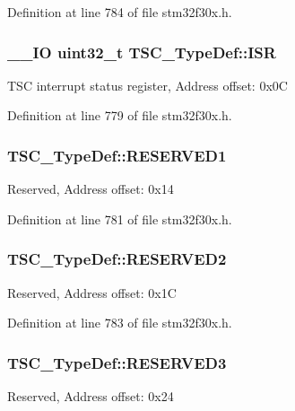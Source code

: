 Definition at line 784 of file stm32f30x.\-h.

\hypertarget{struct_t_s_c___type_def_a7d65e605788d739a9b23a9b4a45fd10b}{
\subsubsection[{I\-S\-R}]{\setlength{\rightskip}{0pt plus 5cm}\-\_\-\-\_\-\-I\-O {\bf uint32\-\_\-t} T\-S\-C\-\_\-\-Type\-Def\-::\-I\-S\-R}}\label{struct_t_s_c___type_def_a7d65e605788d739a9b23a9b4a45fd10b}
T\-S\-C interrupt status register, Address offset\-: 0x0\-C 

Definition at line 779 of file stm32f30x.\-h.

\hypertarget{struct_t_s_c___type_def_a27f20ff0eccdc070477448b973ca8df7}{
\subsubsection[{R\-E\-S\-E\-R\-V\-E\-D1}]{ T\-S\-C\-\_\-\-Type\-Def\-::\-R\-E\-S\-E\-R\-V\-E\-D1}}\label{struct_t_s_c___type_def_a27f20ff0eccdc070477448b973ca8df7}
Reserved, Address offset\-: 0x14 

Definition at line 781 of file stm32f30x.\-h.

\hypertarget{struct_t_s_c___type_def_a7ff59eaa0f8c9e69e6736dddc514a037}{
\subsubsection[{R\-E\-S\-E\-R\-V\-E\-D2}]{ T\-S\-C\-\_\-\-Type\-Def\-::\-R\-E\-S\-E\-R\-V\-E\-D2}}\label{struct_t_s_c___type_def_a7ff59eaa0f8c9e69e6736dddc514a037}
Reserved, Address offset\-: 0x1\-C 

Definition at line 783 of file stm32f30x.\-h.

\hypertarget{struct_t_s_c___type_def_a0d47873260f8f0c16b8ec77e1edc8789}{
\subsubsection[{R\-E\-S\-E\-R\-V\-E\-D3}]{ T\-S\-C\-\_\-\-Type\-Def\-::\-R\-E\-S\-E\-R\-V\-E\-D3}}\label{struct_t_s_c___type_def_a0d47873260f8f0c16b8ec77e1edc8789}
Reserved, Address offset\-: 0x24 

